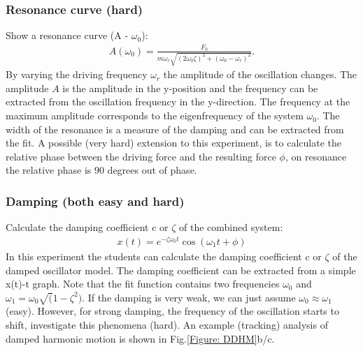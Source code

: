 \documentclass{article}
\begin{document}
\subsubsection{Resonance curve (hard)}    
Show a resonance curve (A - $\omega_0$):
\begin{align}
    A(\omega_0) = \frac{F_0}{m\omega_r \sqrt{(2\omega_0\zeta)^2+(\omega_0-\omega_r)^2}}.
\end{align}
By varying the driving frequency $\omega_r$ the amplitude of the oscillation changes. The amplitude $A$ is the amplitude in the y-position and the frequency can be extracted from the oscillation frequency in the y-direction. The frequency at the maximum amplitude corresponds to the eigenfrequency of the system $\omega_0$. The width of the resonance is a measure of the damping and can be extracted from the fit. A possible (very hard) extension to this experiment, is to calculate the relative phase between the driving force and the resulting force $\phi$, on resonance the relative phase is 90 degrees out of phase. 

\subsubsection{Damping (both easy and hard)}    
Calculate the damping coefficient c or $\zeta$ of the combined system:
\begin{align}
    x(t) = e^{-\zeta\omega_0 t}\cos(\omega_1t + \phi)
\end{align}
In this experiment the students can calculate the damping coefficient c or $\zeta$ of the damped oscillator model. The damping coefficient can be extracted from a simple x(t)-t graph. Note that the fit function contains two frequencies $\omega_0$ and $\omega_1 = \omega_0\sqrt(1-\zeta^2)$. If the damping is very weak, we can just assume $\omega_0\approx\omega_1$ (easy). However, for strong damping, the frequency of the oscillation starts to shift, investigate this phenomena (hard). An example (tracking) analysis of damped harmonic motion is shown in Fig.\ref{Figure: DDHM}b/c. 
\end{document}
